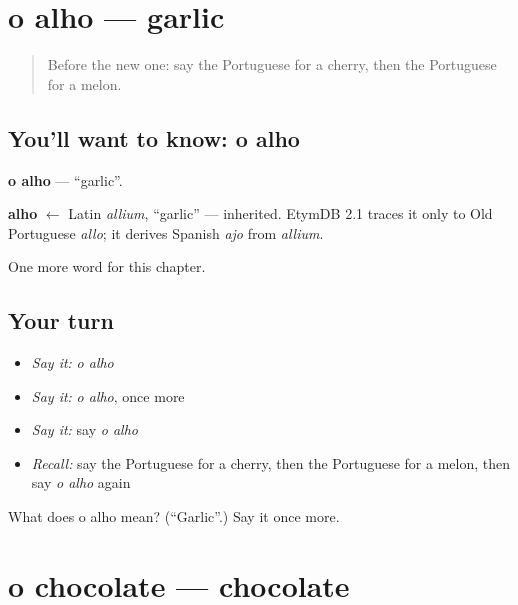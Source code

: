 \section[o alho]{o alho — garlic}

\label{lesson:PT-C106-alho}



\begin{quote}
Before the new one: say the Portuguese for a cherry, then the Portuguese for a melon.
\end{quote}

\subsection*{You'll want to know: o alho}
\textbf{o alho} — \textquotedblleft{}garlic\textquotedblright{}.

\begin{cousinweb}
\textbf{alho} $\leftarrow$ Latin \emph{allium}, \textquotedblleft{}garlic\textquotedblright{} — inherited. EtymDB 2.1 traces it only to Old Portuguese \emph{allo}; it derives Spanish \emph{ajo} from \emph{allium}.
\end{cousinweb}

\begin{grammarlens}[title={What you've built}]
One more word for this chapter.
\end{grammarlens}

\subsection*{Your turn}
\begin{itemize}
\raggedright
  \item \emph{Say it:} \emph{o alho}
  \item \emph{Say it:} \emph{o alho}, once more
  \item \emph{Say it:} say \emph{o alho}
  \item \emph{Recall:} say the Portuguese for a cherry, then the Portuguese for a melon, then say \emph{o alho} again
\end{itemize}

\begin{tcolorbox}[breakable,colback=teal!4,colframe=teal!35!black,title={Before you move on}]
What does o alho mean? (\textquotedblleft{}Garlic\textquotedblright{}.) Say it once more.
\end{tcolorbox}
\section[o chocolate]{o chocolate — chocolate}

